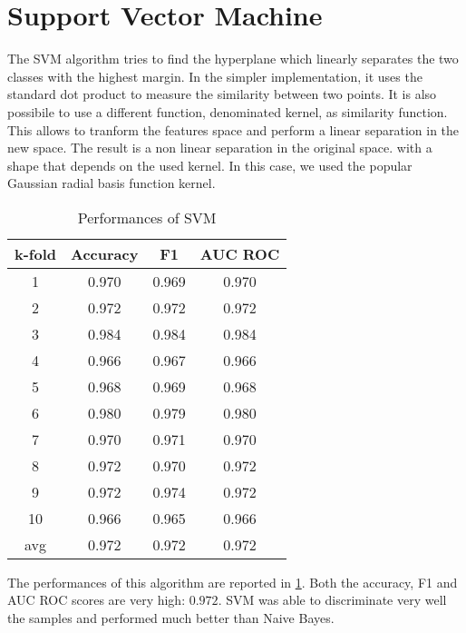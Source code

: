 \section{Support Vector Machine}
\label{sec:svm}

The \ac{SVM} algorithm tries to find the hyperplane which linearly separates the two classes with the highest margin.
In the simpler implementation, it uses the standard dot product to measure the similarity between two points.
It is also possibile to use a different function, denominated kernel, as similarity function.
This allows to tranform the features space and perform a linear separation in the new space.
The result is a non linear separation in the original space. with a shape that depends on the used kernel.
In this case, we used the popular Gaussian radial basis function kernel.

\begin{table}
	\centering
	\caption{Performances of SVM}
	\label{tab:svm}
	\begin{tabular}{cccc}
		\toprule
			\multicolumn{1}{c}{k-fold} &
			\multicolumn{1}{c}{Accuracy} &
			\multicolumn{1}{c}{F1} &
			\multicolumn{1}{c}{AUC ROC} \\
		\midrule
			  1  & 0.970 & 0.969 & 0.970 \\
			  2  & 0.972 & 0.972 & 0.972 \\
			  3  & 0.984 & 0.984 & 0.984 \\
			  4  & 0.966 & 0.967 & 0.966 \\
			  5  & 0.968 & 0.969 & 0.968 \\
			  6  & 0.980 & 0.979 & 0.980 \\
			  7  & 0.970 & 0.971 & 0.970 \\
			  8  & 0.972 & 0.970 & 0.972 \\
			  9  & 0.972 & 0.974 & 0.972 \\
			 10  & 0.966 & 0.965 & 0.966 \\[2pt]
			\hline
			 avg & 0.972 & 0.972 & 0.972 \Tstrut\Bstrut\\
		\bottomrule
	\end{tabular}
\end{table}

The performances of this algorithm are reported in \cref{tab:svm}.
Both the accuracy, F1 and AUC ROC scores are very high: $0.972$.
\ac{SVM} was able to discriminate very well the samples and performed much better than Naive Bayes.
